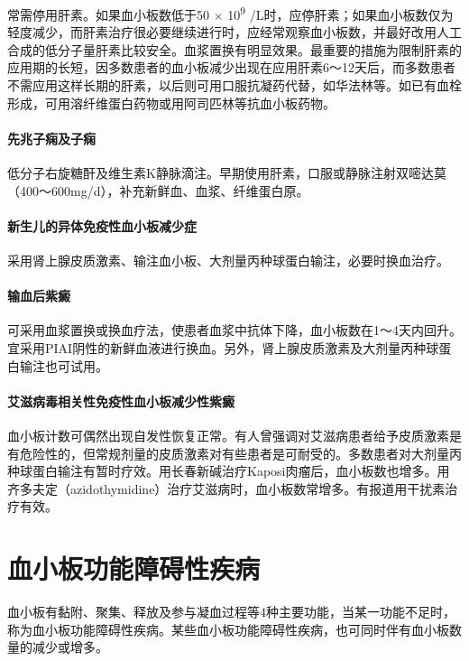 常需停用肝素。如果血小板数低于50 × 10\textsuperscript{9}
/L时，应停肝素；如果血小板数仅为轻度减少，而肝素治疗很必要继续进行时，应经常观察血小板数，并最好改用人工合成的低分子量肝素比较安全。血浆置换有明显效果。最重要的措施为限制肝素的应用期的长短，因多数患者的血小板减少出现在应用肝素6～12天后，而多数患者不需应用这样长期的肝素，以后则可用口服抗凝药代替，如华法林等。如已有血栓形成，可用溶纤维蛋白药物或用阿司匹林等抗血小板药物。

\paragraph{先兆子痫及子痫}

低分子右旋糖酐及维生素K静脉滴注。早期使用肝素，口服或静脉注射双嘧达莫（400～600mg/d），补充新鲜血、血浆、纤维蛋白原。

\paragraph{新生儿的异体免疫性血小板减少症}

采用肾上腺皮质激素、输注血小板、大剂量丙种球蛋白输注，必要时换血治疗。

\paragraph{输血后紫癜}

可采用血浆置换或换血疗法，使患者血浆中抗体下降，血小板数在1～4天内回升。宜采用PIAI阴性的新鲜血液进行换血。另外，肾上腺皮质激素及大剂量丙种球蛋白输注也可试用。

\paragraph{艾滋病毒相关性免疫性血小板减少性紫癜}

血小板计数可偶然出现自发性恢复正常。有人曾强调对艾滋病患者给予皮质激素是有危险性的，但常规剂量的皮质激素对有些患者是可耐受的。多数患者对大剂量丙种球蛋白输注有暂时疗效。用长春新碱治疗Kaposi肉瘤后，血小板数也增多。用齐多夫定（azidothymidine）治疗艾滋病时，血小板数常增多。有报道用干扰素治疗有效。

\protect\hypertarget{text00333.html}{}{}

\section{血小板功能障碍性疾病}

血小板有黏附、聚集、释放及参与凝血过程等4种主要功能，当某一功能不足时，称为血小板功能障碍性疾病。某些血小板功能障碍性疾病，也可同时伴有血小板数量的减少或增多。

